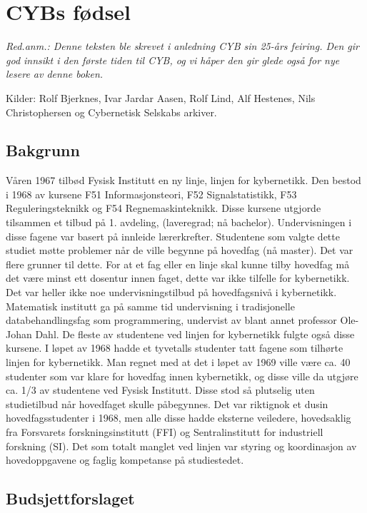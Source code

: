 \chapter{CYBs fødsel}

\author{Skrevet av Jon E. Dahlen}

\textit{Red.anm.: Denne teksten ble skrevet i anledning CYB sin 25-års feiring. Den gir god innsikt i den første tiden til CYB, og vi håper den gir glede også for nye lesere av denne boken.}

Kilder: Rolf Bjerknes, Ivar Jardar Aasen, Rolf Lind, Alf Hestenes, Nils Christophersen og Cybernetisk Selskabs arkiver.

\section{Bakgrunn}

Våren 1967 tilbød Fysisk Institutt en ny linje, linjen for kybernetikk. Den bestod i 1968 av kursene F51 Informasjonsteori, F52 Signalstatistikk, F53 Reguleringsteknikk og F54 Regnemaskinteknikk. Disse kursene utgjorde tilsammen et tilbud på 1. avdeling, (laveregrad; nå bachelor). Undervisningen i disse fagene var basert på innleide lærerkrefter. Studentene som valgte dette studiet møtte problemer når de ville begynne på hovedfag (nå master). Det var flere grunner til dette. For at et fag eller en linje skal kunne tilby hovedfag må det være minst ett dosentur innen faget, dette var ikke tilfelle for kybernetikk. Det var heller ikke noe undervisningstilbud på hovedfagsnivå i kybernetikk. Matematisk institutt ga på samme tid undervisning i tradisjonelle databehandlingsfag som programmering, undervist av blant annet professor Ole-Johan Dahl. De fleste av studentene ved linjen for kybernetikk fulgte også disse kursene. I løpet av 1968 hadde et tyvetalls studenter tatt fagene som tilhørte linjen for kybernetikk. Man regnet med at det i løpet av 1969 ville være ca. 40 studenter som var klare for hovedfag innen kybernetikk, og disse ville da utgjøre ca. 1/3 av studentene ved Fysisk Institutt. Disse stod så plutselig uten studietilbud når hovedfaget skulle påbegynnes. Det var riktignok et dusin hovedfagsstudenter i 1968, men alle disse hadde eksterne veiledere, hovedsaklig fra Forsvarets forskningsinstitutt (FFI) og Sentralinstitutt for industriell forskning (SI). Det som totalt manglet ved linjen var styring og koordinasjon av hovedoppgavene og faglig kompetanse på studiestedet.

\section{Budsjettforslaget}


